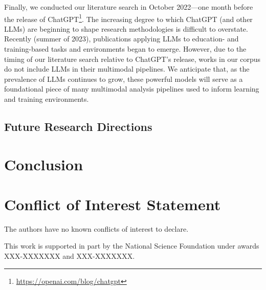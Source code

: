 \documentclass[manuscript,screen,review]{acmart}
\begin{document}
Finally, we conducted our literature search in October 2022---one month before the release of ChatGPT\footnote{\href{https://openai.com/blog/chatgpt}{https://openai.com/blog/chatgpt}}. The increasing degree to which ChatGPT (and other LLMs) are beginning to shape research methodologies is difficult to overstate. Recently (summer of 2023), publications applying LLMs to education- and training-based tasks and environments began to emerge. However, due to the timing of our literature search relative to ChatGPT's release, works in our corpus do not include LLMs in their multimodal pipelines. We anticipate that, as the prevalence of LLMs continues to grow, these powerful models will serve as a foundational piece of many multimodal analysis pipelines used to inform learning and training environments.

\subsection{Future Research Directions} 

\section{Conclusion}




\section*{Conflict of Interest Statement}
The authors have no known conflicts of interest to declare. 

\begin{acks} 
This work is supported in part by the National Science Foundation under awards XXX-XXXXXXX and XXX-XXXXXXX.
\end{acks}




\end{document}
